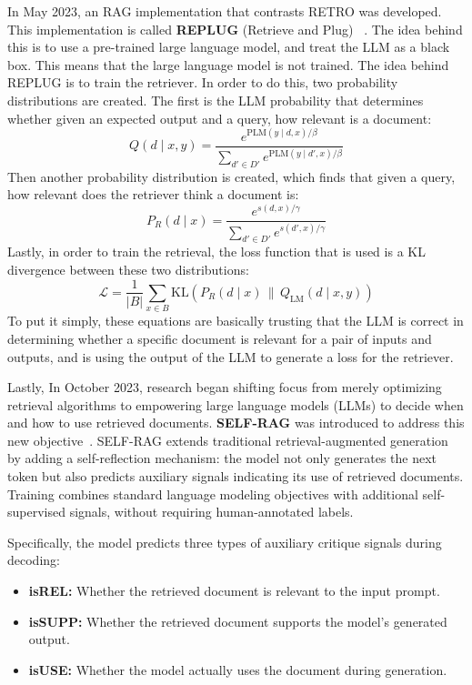 \documentclass[twocolumn, 10pt]{article}
\begin{document}
In May 2023, an RAG implementation that contrasts RETRO was developed. This implementation is called \textbf{REPLUG} (Retrieve and Plug) ~\cite{shi2023replug}. The idea behind this is to use a pre-trained large language model, and treat the LLM as a black box. This means that the large language model is not trained.
The idea behind REPLUG is to train the retriever. In order to do this, two probability distributions are created. The first is the LLM probability that determines whether given an expected output and a query, how relevant is a document:
\begin{equation*}
Q(d \mid x, y) = \frac{e^{\text{PLM}(y \mid d, x) / \beta}}{\sum_{d' \in D'} e^{\text{PLM}(y \mid d', x) / \beta}}
\end{equation*}
Then another probability distribution is created, which finds that given a query, how relevant does the retriever think a document is:
\begin{equation*}
P_R(d \mid x) = \frac{e^{s(d,x)/\gamma}}{\sum_{d' \in D'} e^{s(d',x)/\gamma}}
\end{equation*}
Lastly, in order to train the retrieval, the loss function that is used is a KL divergence between these two distributions:
\begin{equation*}
\mathcal{L} = \frac{1}{|B|} \sum_{x \in B} \text{KL}\left( P_R(d \mid x) \, \| \, Q_{\text{LM}}(d \mid x, y) \right)
\end{equation*}
To put it simply, these equations are basically trusting that the LLM is correct in determining whether a specific document is relevant for a pair of inputs and outputs, and is using the output of the LLM to generate a loss for the retriever.


Lastly, In October 2023, research began shifting focus from merely optimizing retrieval algorithms to empowering large language models (LLMs) to decide when and how to use retrieved documents.  
\textbf{SELF-RAG} was introduced to address this new objective~\cite{asai2023selfrag}.  
SELF-RAG extends traditional retrieval-augmented generation by adding a self-reflection mechanism: the model not only generates the next token but also predicts auxiliary signals indicating its use of retrieved documents.  
Training combines standard language modeling objectives with additional self-supervised signals, without requiring human-annotated labels.

Specifically, the model predicts three types of auxiliary critique signals during decoding:

\begin{itemize}
    \item \textbf{isREL:} Whether the retrieved document is relevant to the input prompt.
    \item \textbf{isSUPP:} Whether the retrieved document supports the model's generated output.
    \item \textbf{isUSE:} Whether the model actually uses the document during generation.
\end{itemize}
\end{document}
